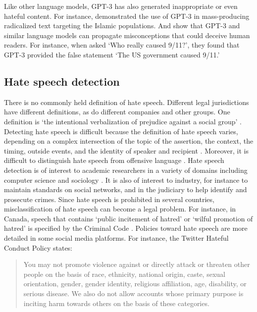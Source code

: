 \documentclass[12pt,]{article}
\begin{document}
Like other language models, GPT-3 has also generated inappropriate or even hateful content. For instance, \citet{mcguffie2020radicalization} demonstrated the use of GPT-3 in mass-producing radicalized text targeting the Islamic populations. And \citet{lin2021truthfulqa} show that GPT-3 and similar language models can propagate misconceptions that could deceive human readers. For instance, when asked `Who really caused 9/11?', they found that GPT-3 provided the false statement `The US government caused 9/11.'

\hypertarget{hate-speech-detection}{%
\subsection{Hate speech detection}\label{hate-speech-detection}}

There is no commonly held definition of hate speech. Different legal jurisdictions have different definitions, as do different companies and other groups. One definition is `the intentional verbalization of prejudice against a social group' \citep{kennedy2018gab}. Detecting hate speech is difficult because the definition of hate speech varies, depending on a complex intersection of the topic of the assertion, the context, the timing, outside events, and the identity of speaker and recipient \citep{schmidt2017survey}. Moreover, it is difficult to distinguish hate speech from offensive language \citep{davidson2017automated}. Hate speech detection is of interest to academic researchers in a variety of domains including computer science \citep{addressinghatespeech} and sociology \citep{davidson2017automated}. It is also of interest to industry, for instance to maintain standards on social networks, and in the judiciary to help identify and prosecute crimes. Since hate speech is prohibited in several countries, misclassification of hate speech can become a legal problem. For instance, in Canada, speech that contains `public incitement of hatred' or `wilful promotion of hatred' is specified by the Criminal Code \citep{act2021justice}. Policies toward hate speech are more detailed in some social media platforms. For instance, the Twitter Hateful Conduct Policy states:

\begin{quote}
You may not promote violence against or directly attack or threaten other people on the basis of race, ethnicity, national origin, caste, sexual orientation, gender, gender identity, religious affiliation, age, disability, or serious disease. We also do not allow accounts whose primary purpose is inciting harm towards others on the basis of these categories.

\citet{twitterpolicy2017}
\end{quote}
\end{document}
